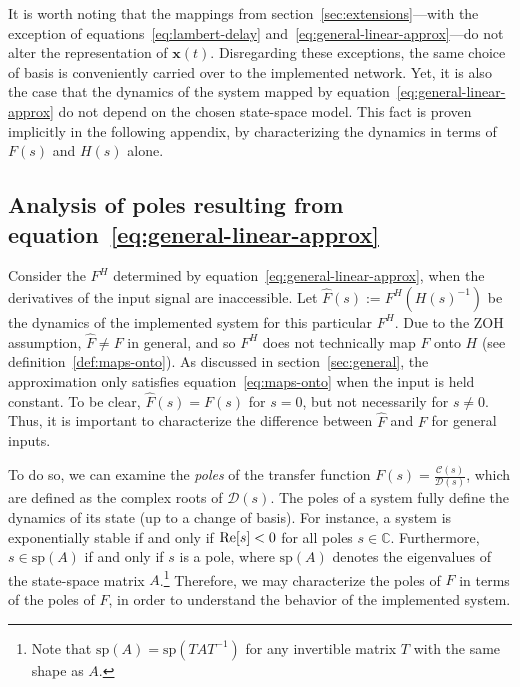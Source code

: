 \documentclass[12pt]{article}
\theoremstyle{definition}
\renewcommand{\vec}{\mathbf}  %
\let\originalleft\left
\let\originalright\right
\renewcommand{\left}{\mathopen{}\mathclose\bgroup\originalleft}
\renewcommand{\right}{\aftergroup\egroup\originalright}
\begin{document}

It is worth noting that the mappings from section~\ref{sec:extensions}---with the exception of equations~\ref{eq:lambert-delay} and~\ref{eq:general-linear-approx}---do not alter the representation of $\vec{x}(t)$.
Disregarding these exceptions, the same choice of basis is conveniently carried over to the implemented network.
Yet, it is also the case that the dynamics of the system mapped by equation~\ref{eq:general-linear-approx} do not depend on the chosen state-space model.
This fact is proven implicitly in the following appendix, by characterizing the dynamics in terms of $F(s)$ and $H(s)$ alone.

\subsection{Analysis of poles resulting from equation~\ref{eq:general-linear-approx}}
\label{app:poles}

Consider the $F^H$ determined by equation~\ref{eq:general-linear-approx}, when the derivatives of the input signal are inaccessible.
Let $\hat{F}(s) := F^{H}(H(s)^{-1})$ be the dynamics of the implemented system for this particular $F^H$.
Due to the ZOH assumption, $\hat{F} \ne F$ in general, and so $F^H$ does not technically map $F$ onto $H$ (see definition~\ref{def:maps-onto}).
As discussed in section~\ref{sec:general}, the approximation only satisfies equation~\ref{eq:maps-onto} when the input is held constant.
To be clear, $\hat{F}(s) = F(s)$ for $s = 0$, but not necessarily for $s \ne 0$.
Thus, it is important to characterize the difference between $\hat{F}$ and $F$ for general inputs.

To do so, we can examine the \emph{poles} of the transfer function $F(s) = \frac{\mathcal{C}(s)}{\mathcal{D}(s)}$, which are defined as the complex roots of $\mathcal{D}(s)$.
The poles of a system fully define the dynamics of its state (up to a change of basis).
For instance, a system is exponentially stable if and only if $\text{Re} \left[ s \right] < 0$ for all poles $s \in \mathbb{C}$.
Furthermore, $s \in \text{sp}(A)$ if and only if $s$ is a pole, where $\text{sp}(A)$ denotes the eigenvalues of the state-space matrix $A$.\footnote{
Note that $\text{sp}(A) = \text{sp}(TAT^{-1})$ for any invertible matrix $T$ with the same shape as $A$.
}
Therefore, we may characterize the poles of $\hat{F}$ in terms of the poles of $F$, in order to understand the behavior of the implemented system.
\end{document}
